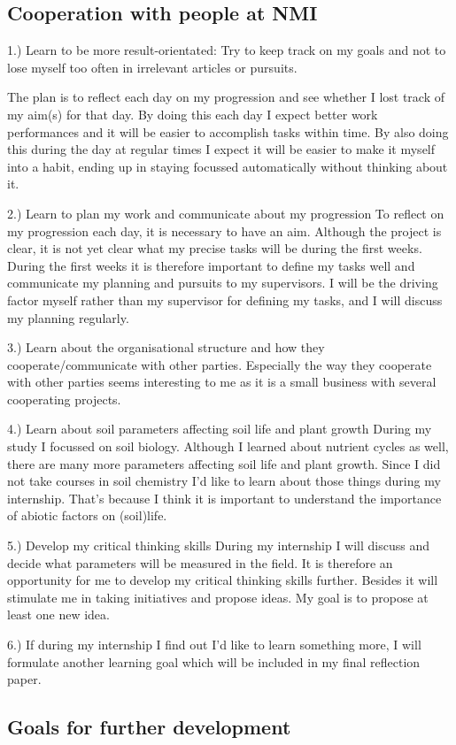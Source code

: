 \documentclass[10pt,twoside,dutch,english]{report}
\begin{document}
\subsection{Cooperation with people at NMI}

1.)	Learn to be more result-orientated: Try to keep track on my goals and not to lose myself too often in irrelevant articles or pursuits.

The plan is to reflect each day on my progression and see whether I lost track of my aim(s) for that day. By doing this each day I expect better work performances and it will be easier to accomplish tasks within time. By also doing this during the day at regular times I expect it will be easier to make it myself into a habit, ending up in staying focussed automatically without thinking about it.

2.)	Learn to plan my work and communicate about my progression
To reflect on my progression each day, it is necessary to have an aim. Although the project is clear, it is not yet clear what my precise tasks will be during the first weeks. During the first weeks it is therefore important to define my tasks well and communicate my planning and pursuits to my supervisors. I will be the driving factor myself rather than my supervisor for defining my tasks, and I will discuss my planning regularly.

3.)	Learn about the organisational structure and how they cooperate/communicate with other parties.
Especially the way they cooperate with other parties seems interesting to me as it is a small business with several cooperating projects.

4.)	Learn about soil parameters affecting soil life and plant growth
During my study I focussed on soil biology. Although I learned about nutrient cycles as well, there are many more parameters affecting soil life and plant growth. Since I did not take courses in soil chemistry I’d like to learn about those things during my internship. That’s because I think it is important to understand the importance of abiotic factors on (soil)life.

5.)	Develop my critical thinking skills
During my internship I will discuss and decide what parameters will be measured in the field. It is therefore an opportunity for me to develop my critical thinking skills further. Besides it will stimulate me in taking initiatives and propose ideas. My goal is to propose at least one new idea. 

6.)	If during my internship I find out I’d like to learn something more, I will formulate another learning goal which will be included in my final reflection paper. 

\subsection{Goals for further development}
\end{document}
